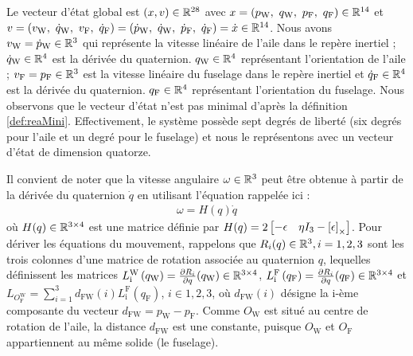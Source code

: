 Le vecteur d'état global est $(x,v) \in {\mathbb R}^{28}$ avec $x=(p_{\text{W}},~q_{\text{W}},~p_{\text{F}},~q_{\text{F}}) \in {\mathbb R}^{14}$ et $v=(v_{\text{W}},~\dot{q}_{\text{W}},~v_{\text{F}},~\dot{q}_{\text{F}}) = (\dot{p}_{\text{W}},~\dot{q}_{\text{W}},~\dot{p}_{\text{F}},~\dot{q}_{\text{F}})=\dot{x} \in {\mathbb R}^{14}$. Nous avons $v_{\text{W}} = \dot{p}_{\text{W}} \in {\mathbb R}^{3}$ qui représente la vitesse linéaire de l'aile dans le repère inertiel ; $\dot{q}_{\text{W}} \in {\mathbb R}^{4}$  est la dérivée du quaternion. $q_{\text{W}} \in {\mathbb R}^{4}$ représentant l'orientation de l'aile ; $v_{\text{F}} =p_{\text{F}} \in {\mathbb R}^{3}$  est la vitesse linéaire du fuselage dans le repère inertiel et $\dot{q}_{\text{F}} \in {\mathbb R}^{4}$  est la dérivée du quaternion. $q_{\text{F}} \in {\mathbb R}^{4}$ représentant l'orientation du fuselage. Nous observons que le vecteur d'état n'est pas minimal d'après la définition \ref{def:reaMini}. Effectivement, le système possède sept degrés de liberté (six degrés pour l'aile et un degré pour le fuselage) et nous le représentons avec un vecteur d'état de dimension quatorze.

Il convient de noter que la vitesse angulaire $\omega \in {\mathbb R}^{3}$ peut être obtenue à partir de la dérivée du quaternion $\dot{q}$ en utilisant l'équation \cite[équation (2.7)]{udwadia-schutte} rappelée ici : 
\begin{align*}
    \omega = H(q) \dot{q} 
\end{align*}
où $H(q) \in {\mathbb R}^{3\times4}$ est une matrice définie par $H(q) = 2\begin{bmatrix}-\epsilon & \eta I_{3} - \left[\epsilon\right]_{\times}\end{bmatrix}$.
Pour dériver les équations du mouvement, rappelons que  $R_{i}(q) \in {\mathbb R}^{3}, i = 1,2,3$ sont les trois colonnes d'une matrice de rotation associée au quaternion $q$, lequelles définissent les matrices $L_{\text{i}}^{\text{W}} \left( q_{\text{W}} \right) = \frac{\partial R_{i}}{\partial q}(q_{\text{W}}) \in {\mathbb R}^{3\times4}$, 
$L_{\text{i}}^{\text{F}} \left( q_{\text{F}} \right) = \frac{\partial R_{i}}{\partial q}(q_{\text{F}}) \in {\mathbb R}^{3\times4}$ et
$L_{O_{\text{F}}^{\text{W}}} = \sum_{i=1}^{3} d_{\text{FW}}(i) L_{\text{i}}^{\text{F}} (q_{\text{F}})$, $i \in {1,2,3}$, où $d_{\text{FW}}(i)$ désigne la i-ème composante du vecteur $d_{\text{FW}} = p_{\text{W}} - p_{\text{F}}$. Comme $O_{\text{W}}$ est situé au centre de rotation de l'aile, la distance $d_{\text{FW}}$ est une constante, puisque $O_{\text{W}}$ et $O_{\text{F}}$ appartiennent au même solide (le fuselage).

